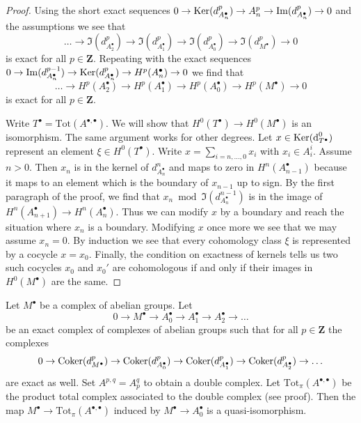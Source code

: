 \begin{proof}
Using the short exact sequences
$0 \to \mathop{\mathrm{Ker}}(d^p_{A_n^\bullet}) \to A_n^p \to \mathop{\mathrm{Im}}(d^p_{A_n^\bullet}) \to 0$
and the assumptions we see that
$$
\ldots \to \Im(d_{A_2^\bullet}^p) \to \Im(d_{A_1^\bullet}^p)
\to \Im(d_{A_0^\bullet}^p) \to \Im(d_{M^\bullet}^p) \to 0
$$
is exact for all $p \in \mathbf{Z}$. Repeating with the exact sequences
$0 \to \mathop{\mathrm{Im}}(d^{p - 1}_{A_n^\bullet}) \to \mathop{\mathrm{Ker}}(d^p_{A_n^\bullet})
\to H^p(A_n^\bullet) \to 0$ we find that
$$
\ldots \to H^p(A_2^\bullet) \to H^p(A_1^\bullet)
\to H^p(A_0^\bullet) \to H^p(M^\bullet) \to 0
$$
is exact for all $p \in \mathbf{Z}$.

\medskip\noindent
Write $T^\bullet = \text{Tot}(A^{\bullet, \bullet})$. We will show that
$H^0(T^\bullet) \to H^0(M^\bullet)$ is an isomorphism. The same argument
works for other degrees. Let $x \in \mathop{\mathrm{Ker}}(\text{d}_{T^\bullet}^0)$ represent
an element $\xi \in H^0(T^\bullet)$.
Write $x = \sum_{i = n, \ldots, 0} x_i$ with $x_i \in A_i^i$.
Assume $n > 0$. Then $x_n$ is in the kernel of $d_{A_n^\bullet}^n$
and maps to zero in $H^n(A_{n - 1}^\bullet)$ because it maps
to an element which is the boundary of $x_{n - 1}$ up to sign.
By the first paragraph of the proof, we find that
$x_n \bmod \Im(d^{n - 1}_{A_n^\bullet})$
is in the image of $H^n(A_{n + 1}^\bullet) \to H^n(A_n^\bullet)$.
Thus we can modify $x$ by a boundary and reach the situation
where $x_n$ is a boundary. Modifying $x$ once more we see that
we may assume $x_n = 0$. By induction we see that every cohomology
class $\xi$ is represented by a cocycle $x = x_0$.
Finally, the condition on exactness of kernels tells us
two such cocycles $x_0$ and $x_0'$ are cohomologous if
and only if their images in $H^0(M^\bullet)$ are the same.
\end{proof}

\begin{lemma}
\label{lemma-good-right-resolution-gives-qis}
Let $M^\bullet$ be a complex of abelian groups. Let
$$
0 \to M^\bullet \to A_0^\bullet \to A_1^\bullet \to A_2^\bullet \to \ldots
$$
be an exact complex of complexes of abelian groups
such that for all $p \in \mathbf{Z}$ the complexes
$$
0 \to
\mathop{\mathrm{Coker}}(d_{M^\bullet}^p) \to
\mathop{\mathrm{Coker}}(d_{A_0^\bullet}^p) \to
\mathop{\mathrm{Coker}}(d_{A_1^\bullet}^p) \to
\mathop{\mathrm{Coker}}(d_{A_2^\bullet}^p) \to \ldots
$$
are exact as well. Set $A^{p, q} = A_p^q$ to obtain a double
complex. Let $\text{Tot}_\pi(A^{\bullet, \bullet})$ be the
product total complex associated to the double complex
(see proof). Then the map
$M^\bullet \to \text{Tot}_\pi(A^{\bullet, \bullet})$
induced by $M^\bullet \to A_0^\bullet$ is a quasi-isomorphism.
\end{lemma}

